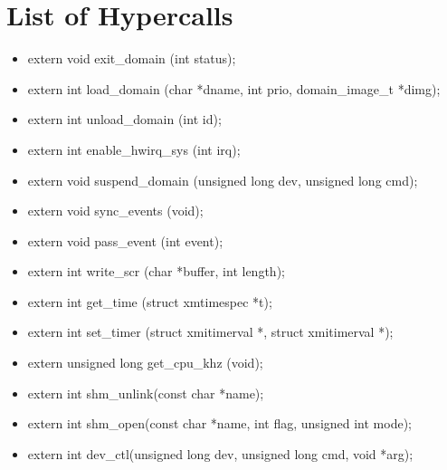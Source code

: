 \section{List of Hypercalls}
\begin{itemize}
\item	extern void exit\_domain (int status); 
\item	extern int load\_domain (char *dname, int prio, domain\_image\_t *dimg);
\item	extern int unload\_domain (int id);
\item	extern int enable\_hwirq\_sys (int irq);
\item	extern void suspend\_domain (unsigned long dev, unsigned long cmd);
\item	extern void sync\_events (void);
\item	extern void pass\_event (int event);
\item	extern int write\_scr (char *buffer, int length);
\item	extern int get\_time (struct xmtimespec *t);
\item	extern int set\_timer (struct xmitimerval *, struct xmitimerval *);
\item	extern unsigned long get\_cpu\_khz (void);
\item	extern int shm\_unlink(const char *name);
\item	extern int shm\_open(const char *name, int flag, unsigned int mode);
\item	extern int dev\_ctl(unsigned long dev, unsigned long cmd, void *arg);
\end{itemize}
